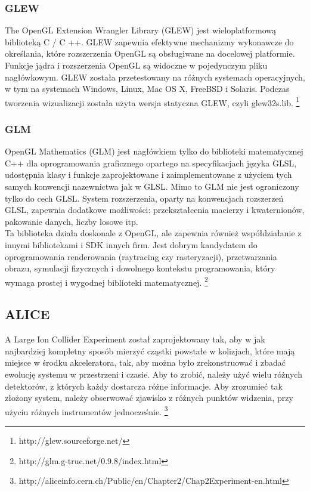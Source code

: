 \subsubsection{GLEW}
The OpenGL Extension Wrangler Library (GLEW) jest wieloplatformową biblioteką C / C ++. GLEW zapewnia efektywne mechanizmy wykonawcze do określania, które rozszerzenia OpenGL są obsługiwane na docelowej platformie. Funkcje jądra i rozszerzenia OpenGL są widoczne w pojedynczym pliku nagłówkowym. GLEW została przetestowany na różnych systemach operacyjnych, w tym na systemach Windows, Linux, Mac OS X, FreeBSD i Solaris.
Podczas tworzenia wizualizacji została użyta wersja statyczna GLEW, czyli glew32s.lib. \footnote{http://glew.sourceforge.net/}

\subsubsection{GLM}
OpenGL Mathematics (GLM) jest nagłówkiem tylko do biblioteki matematycznej C++ dla oprogramowania graficznego opartego na specyfikacjach języka GLSL, udostępnia klasy i funkcje zaprojektowane i zaimplementowane z użyciem tych samych konwencji nazewnictwa jak w GLSL. Mimo to GLM nie jest ograniczony tylko do cech GLSL. System rozszerzenia, oparty na konwencjach rozszerzeń GLSL, zapewnia dodatkowe możliwości: przekształcenia macierzy i kwaternionów, pakowanie danych, liczby losowe itp. \\
Ta biblioteka działa doskonale z OpenGL, ale zapewnia również współdziałanie z innymi bibliotekami i SDK innych firm. Jest dobrym kandydatem do oprogramowania renderowania (raytracing czy rasteryzacji), przetwarzania obrazu, symulacji fizycznych i dowolnego kontekstu programowania, który wymaga prostej i wygodnej biblioteki matematycznej. 
\footnote{http://glm.g-truc.net/0.9.8/index.html}



\subsection{ALICE}
A Large Ion Collider Experiment został zaprojektowany tak, aby w jak najbardziej kompletny sposób mierzyć cząstki powstałe w kolizjach, które mają miejsce w środku akceleratora, tak, aby można było zrekonstruować i zbadać ewolucję systemu w przestrzeni i czasie. Aby to zrobić, należy użyć wielu różnych detektorów, z których każdy dostarcza różne informacje. Aby zrozumieć tak złożony system, należy obserwować zjawisko z różnych punktów widzenia, przy użyciu różnych instrumentów jednocześnie. \footnote{http://aliceinfo.cern.ch/Public/en/Chapter2/Chap2Experiment-en.html}
